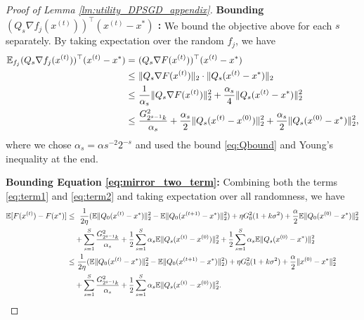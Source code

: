 \begin{proof}[Proof of Lemma \ref{lm:utility_DPSGD_appendix}]
{\bf  Bounding $(Q_s\nabla f_j(x^{(t)}))^\top (x^{(t)}-x^*)$ :}
We bound the objective above for each $s$ separately. 
By taking expectation over the random $f_j$, we have
\begin{align}
\mathbb{E}_{f_j}(Q_{s}\nabla f_{j}(x^{(t)}))^{\top}(x^{(t)}-x^{*}) = &~ (Q_{s}\nabla F(x^{(t)}))^{\top}(x^{(t)}-x^{*}) \nonumber\\
\leq & ~ \|Q_{s}\nabla F(x^{(t)})\|_2
            \cdot \|Q_s(x^{(t)}-x^{*})\|_2 \nonumber \\
\leq &~ \frac{1}{\alpha_{s}}\|Q_{s}\nabla F(x^{(t)})\|_2^{2} + 
            \frac{\alpha_{s}}{4}\|Q_{s}(x^{(t)}-x^{*})\|_2^{2} \nonumber \\
\leq &~ \frac{G_{2^{s-1}k}^{2}}{\alpha_{s}} + 
            \frac{\alpha_{s}}{2}\|Q_{s}(x^{(t)}-x^{(0)})\|_2^{2} +
            \frac{\alpha_{s}}{2}\|Q_{s}(x^{(0)}-x^{*})\|_2^{2} \label{eq:term2},
\end{align}
where we chose $\alpha_{s}=\alpha s^{-2} 2^{-s}$ and used the bound \eqref{eq:Qbound} and Young's inequality at the end.

\medskip

{\bf Bounding Equation \eqref{eq:mirror_two_term}:} Combining both the terms \eqref{eq:term1} and \eqref{eq:term2} and taking expectation
over all randomness, we have
\begin{align*}
\mathbb{E} [F(x^{(t)})- F(x^{*})] \leq &~~ \frac{1}{2\eta}(
    \mathbb{E}\|Q_{0}(x^{(t)}-x^{*})\|_2^{2} - 
    \mathbb{E}\|Q_{0}(x^{(t+1)}-x^{*})\|_2^{2}) +
    \eta G_{0}^{2}(1+k\sigma^{2})+\frac{\alpha}{2}\mathbb{E}\|Q_{0}(x^{(0)}-x^{*})\|_2^{2}\\
 & +\sum_{s=1}^{S}\frac{G_{2^{s-1}k}^{2}}{\alpha_{s}} + 
    \frac{1}{2}\sum_{s=1}^{S}\alpha_{s}\mathbb{E}\|Q_{s}(x^{(t)}-x^{(0)})\|_2^{2} + 
    \frac{1}{2}\sum_{s=1}^{S}\alpha_s\mathbb{E}\|Q_{s}(x^{(0)}-x^{*})\|_2^{2}\\
\leq &~ \frac{1}{2\eta}(
    \mathbb{E}\|Q_{0}(x^{(t)}-x^{*})\|_2^{2} - 
    \mathbb{E}\|Q_{0}(x^{(t+1)}-x^{*})\|_2^{2}) +
    \eta G_{0}^{2}(1+k\sigma^{2}) + 
    \frac{\alpha}{2}\|x^{(0)}-x^{*}\|_2^{2}\\
 & +\sum_{s=1}^S\frac{G_{2^{s-1}k}^{2}}{\alpha_{s}} + 
    \frac{1}{2}\sum_{s=1}^S\alpha_{s}\mathbb{E}\|Q_{s}(x^{(t)}-x^{(0)})\|_2^{2}.
\end{align*}


\end{proof}
